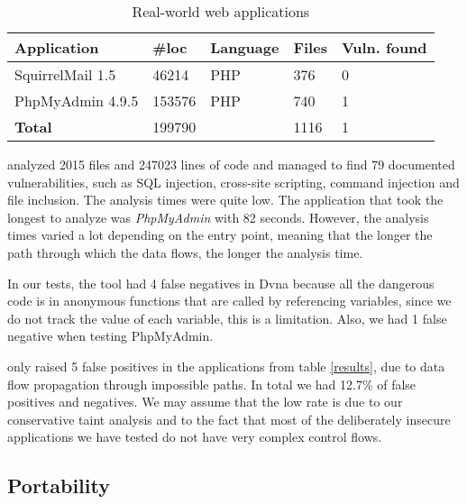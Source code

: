 \begin{table*}[htbp]
    \caption{Real-world web applications}
    \begin{center}
        \begin{tabular}{|l|| l | l  |l | l |}
            \hline
            \textbf{Application}  & \textbf{\#loc}      & \textbf{Language}      & \textbf{Files}     & \textbf{Vuln. found} \\ [0.5ex] 
            \hline\hline   
             SquirrelMail 1.5     & 46214     & PHP        & 376         & 0 \\ 
            \hline
             PhpMyAdmin 4.9.5     & 153576    & PHP        & 740        & 1 \\  [0.5ex]    
            \hline\hline   
            \textbf{Total}        & 199790 &              &  1116 &  1 \\
            \hline
        \end{tabular}
    \label{results1}
    \end{center}
\end{table*}


\toolname{} analyzed 2015 files and 247023 lines of code and managed to find 79 documented vulnerabilities, such as SQL injection, cross-site scripting, command injection and file inclusion. The analysis times were quite low. The application that took the longest to analyze was \textit{PhpMyAdmin} with 82 seconds. However, the analysis times varied a lot depending on the entry point, meaning that the longer the path through which the data flows, the longer the analysis time.

In our tests, the tool had 4 false negatives in Dvna because all the dangerous code is in anonymous functions that are called by referencing variables, since we do not track the value of each variable, this is a limitation. Also, we had 1 false negative when testing PhpMyAdmin.

\toolname{} only raised 5 false positives in the applications from table \ref{results}, due to data flow propagation through impossible paths. In total we had 12.7\% of false positives and negatives. We may assume that the low rate is due to our conservative taint analysis and to the fact that most of the deliberately insecure applications we have tested do not have very complex control flows.



\subsection{Portability}

